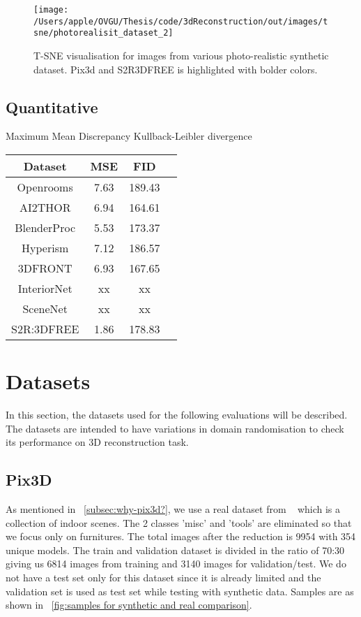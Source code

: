 \begin{figure}
    \centering
    \texttt{[image: /Users/apple/OVGU/Thesis/code/3dReconstruction/out/images/tsne/photorealisit\_dataset\_2]}
    \caption{T-SNE visualisation for images from various photo-realistic synthetic dataset. Pix3d and S2R3DFREE is highlighted with bolder colors.}
    \label{fig:photorealistic tsne}
\end{figure}

\subsection{Quantitative}\label{subsec:quantitative}
Maximum Mean Discrepancy
Kullback-Leibler divergence


\begin{center}
    \begin{tabular}{||c |c |c |c||}
        \hline
        Dataset & MSE & FID \\ [0.5ex]
        \hline\hline
        Openrooms & 7.63 & 189.43 \\
        \hline
         AI2THOR & 6.94 & 164.61 \\
        \hline
        BlenderProc & 5.53 & 173.37 \\
        \hline
        Hyperism & 7.12 & 186.57 \\
        \hline
        3DFRONT & 6.93 & 167.65 \\
        \hline
        InteriorNet & xx & xx \\
        \hline
        SceneNet & xx & xx \\
        \hline
        S2R:3DFREE & 1.86 & 178.83 \\[1ex]
        \hline
    \end{tabular}
\end{center}



\section{Datasets}\label{sec:datasets}
In this section, the datasets used for the following evaluations will be described.
The datasets are intended to have variations in domain randomisation to check its performance on 3D reconstruction task.

\subsection{Pix3D}
As mentioned in ~\ref{subsec:why-pix3d?}, we use a real dataset from ~\cite{pix3d} which is a collection of indoor scenes.
The 2 classes 'misc' and 'tools' are eliminated so that we focus only on furnitures.
The total images after the reduction is 9954 with 354 unique models.
The train and validation dataset is divided in the ratio of 70:30 giving us 6814 images from training and 3140 images for validation/test.
We do not have a test set only for this dataset since it is already limited and the validation set is used as test set while testing with synthetic data.
Samples are as shown in ~\ref{fig:samples for synthetic and real comparison}.

